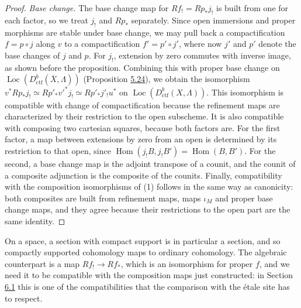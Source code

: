 \documentclass[11pt]{article}
\providecommand{\Hom}{}\renewcommand{\Hom}{\operatorname{Hom}}
\providecommand{\Loc}{}\renewcommand{\Loc}{\operatorname{Loc}}
\begin{document}
\begin{proof}[{Proof}]
\emph{Base change.} The base change map for \(Rf_!=Rp_*j_!\) is built from one for each factor, so we treat \(j_!\) and \(Rp_*\) separately. Since open immersions and proper morphisms are stable under base change, we may pull back a compactification \(f=p\circ j\) along \(v\) to a compactification \(f'=p'\circ j'\), where now \(j'\) and \(p'\) denote the base changes of \(j\) and \(p\). For \(j_!\), extension by zero commutes with inverse image, as shown before the proposition. Combining this with proper base change on \(\Loc(D^b_{\mathrm{ctf}}(\overline X,\Lambda))\) (Proposition \hyperref[bp488]{5.24}), we obtain the isomorphism \(v^*Rp_*j_!\simeq Rp'_*v'^*j_!\simeq Rp'_*j'_!u^*\) on \(\Loc(D^b_{\mathrm{ctf}}(X,\Lambda))\). This isomorphism is compatible with change of compactification because the refinement maps are characterized by their restriction to the open subscheme. It is also compatible with composing two cartesian squares, because both factors are. For the first factor, a map between extensions by zero from an open is determined by its restriction to that open, since \(\Hom(j_!B,j_!B')=\Hom(B,B')\). For the second, a base change map is the adjoint transpose of a counit, and the counit of a composite adjunction is the composite of the counits. Finally, compatibility with the composition isomorphisms of (1) follows in the same way as canonicity: both composites are built from refinement maps, maps \(\iota_M\) and proper base change maps, and they agree because their restrictions to the open part are the same identity.
\end{proof}

\label{bp498}%
On a space, a section with compact support is in particular a section, and so compactly supported cohomology maps to ordinary cohomology. The algebraic counterpart is a map \(Rf_!\to Rf_*\), which is an isomorphism for proper \(f\), and we need it to be compatible with the composition maps just constructed: in Section \hyperref[bp515]{6.1} this is one of the compatibilities that the comparison with the étale site has to respect.
\end{document}
